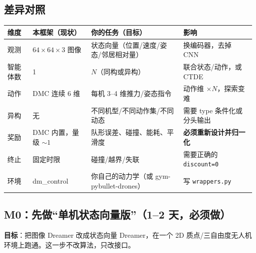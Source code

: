 \documentclass[11pt]{ctexart}
\begin{document}
\subsection{差异对照}
\begin{tabularx}{\textwidth}{L L L L}
\toprule
\textbf{维度} & \textbf{本框架（现状）} & \textbf{你的任务（目标）} & \textbf{影响} \\
\midrule
观测 & $64\times64\times3$ 图像 & 状态向量（位置/速度/姿态/邻居相对量） & 换编码器，去掉 CNN \\
\addlinespace
智能体数 & 1 & $N$（同构或异构） & 联合状态/动作，或 CTDE \\
\addlinespace
动作 & DMC 连续 6 维 & 每机 3--4 维推力/姿态指令 & 动作维 $\times N$，探索变难 \\
\addlinespace
异构 & 无 & 不同机型/不同动作集/不同动态 & 需要 type 条件化或分头输出 \\
\addlinespace
奖励 & DMC 内置，量级 $\sim 1$ & 队形误差、碰撞、能耗、平滑度 & \textbf{必须重新设计并归一化} \\
\addlinespace
终止 & 固定时限 & 碰撞/越界/失联 & 需要正确的 \texttt{discount=0} \\
\addlinespace
环境 & dm\_control & 你自己的动力学（或 gym-pybullet-drones） & 写 \texttt{wrappers.py} \\
\bottomrule
\end{tabularx}

\subsection{M0：先做``单机状态向量版''（1--2 天，必须做）}
\textbf{目标}：把图像 Dreamer 改成状态向量 Dreamer，在一个 2D 质点/三自由度无人机环境上跑通。这一步不改算法，只改接口。
\end{document}
